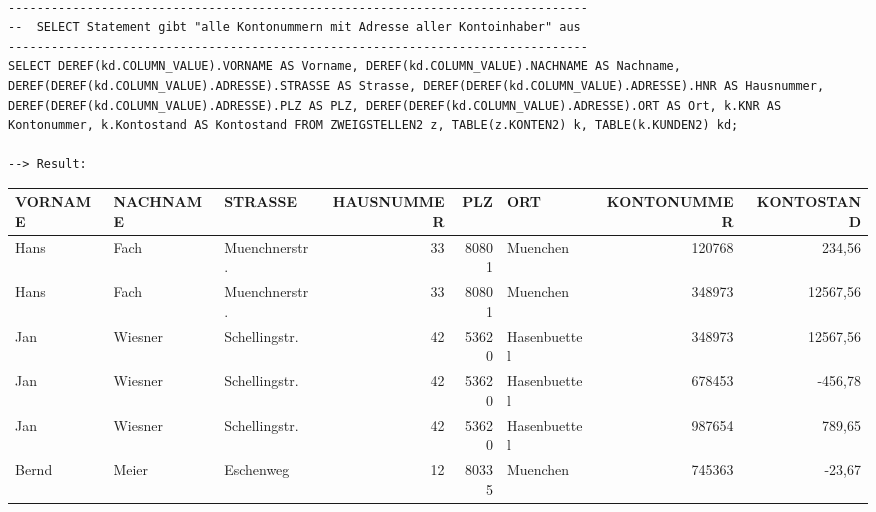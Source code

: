 \documentclass{scrartcl}
\begin{document}
\begin{landscape}
\begin{lstlisting}

---------------------------------------------------------------------------------
--  SELECT Statement gibt "alle Kontonummern mit Adresse aller Kontoinhaber" aus
---------------------------------------------------------------------------------
SELECT DEREF(kd.COLUMN_VALUE).VORNAME AS Vorname, DEREF(kd.COLUMN_VALUE).NACHNAME AS Nachname, DEREF(DEREF(kd.COLUMN_VALUE).ADRESSE).STRASSE AS Strasse, DEREF(DEREF(kd.COLUMN_VALUE).ADRESSE).HNR AS Hausnummer, DEREF(DEREF(kd.COLUMN_VALUE).ADRESSE).PLZ AS PLZ, DEREF(DEREF(kd.COLUMN_VALUE).ADRESSE).ORT AS Ort, k.KNR AS Kontonummer, k.Kontostand AS Kontostand FROM ZWEIGSTELLEN2 z, TABLE(z.KONTEN2) k, TABLE(k.KUNDEN2) kd;

--> Result:
\end{lstlisting}
\begin{tabular}{ l l l r r l r r }
VORNAME      &        NACHNAME     &        STRASSE                &        HAUSNUMMER    &    PLZ & ORT          &        KONTONUMMER & KONTOSTAND \\
\hline
Hans        &         Fach        &         Muenchnerstr.             &              33   &   80801 & Muenchen   &                120768  &   234,56 \\
Hans       &          Fach      &           Muenchnerstr.       &                    33    &  80801  & Muenchen      &             348973 &   12567,56 \\
Jan          &        Wiesner       &       Schellingstr.            &              42    &  53620 & Hasenbuettel    &           348973  & 12567,56 \\
Jan        &          Wiesner    &          Schellingstr.   &                       42  &    53620 & Hasenbuettel   &            678453  &  -456,78 \\
Jan           &       Wiesner      &        Schellingstr.      &                    42   &   53620 & Hasenbuettel       &        987654  &   789,65 \\
Bernd      &          Meier     &           Eschenweg   &                           12    &  80335 & Muenchen              &     745363   &  -23,67 \\
\end{tabular}

\end{landscape}
\end{document}
